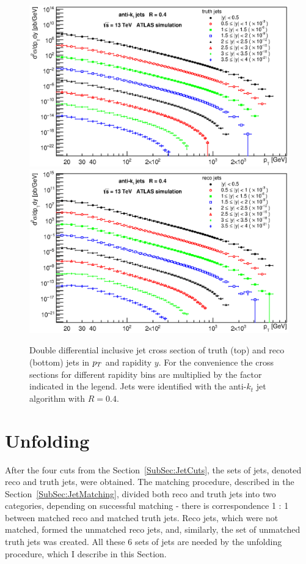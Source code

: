\begin{figure}[p]
  \centering
  \includegraphics[width=\textwidth]{Chapter3/ptTruthAllRapidityBins.eps}
  \includegraphics[width=\textwidth]{Chapter3/ptSignalAllRapidityBins.eps}
  \caption{Double differential inclusive jet cross section of truth (top) and
    reco (bottom) jets in $p_{T}$ and rapidity $y$.  For the convenience the cross
    sections for different rapidity bins are multiplied by the factor indicated
    in the legend. Jets were identified with the anti-$k_t$ jet algorithm with
    $R=0.4$.}
  \label{fig:ptSpectraMasacreEverythingFuck}
\end{figure}

\section{Unfolding}
\label{Sec:Unfolding3}

After the four cuts from the Section~\ref{SubSec:JetCuts}, the sets of jets,
denoted reco and truth jets, were obtained. The matching procedure, described in the
Section~\ref{SubSec:JetMatching},
divided both reco and truth jets into two categories, depending on successful
matching - there is correspondence 1 : 1 between matched reco and matched truth
jets. Reco jets, which were not matched, formed the unmatched reco jets, and,
similarly, the set of unmatched truth jets was created. All these 6 sets of jets
are needed by the unfolding procedure, which I describe in this Section.

